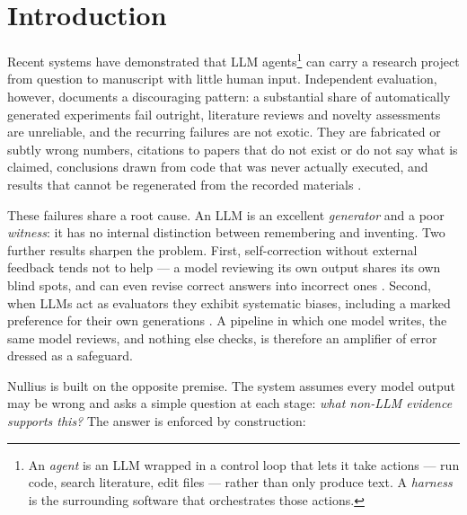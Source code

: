 \documentclass[11pt]{article}
\begin{document}
\vspace{1mm}

\section{Introduction}

Recent systems have demonstrated that LLM agents\footnote{An \emph{agent} is an LLM wrapped in a control loop that lets it take actions --- run code, search literature, edit files --- rather than only produce text. A \emph{harness} is the surrounding software that orchestrates those actions.} can carry a research project from question to manuscript with little human input. Independent evaluation, however, documents a discouraging pattern: a substantial share of automatically generated experiments fail outright, literature reviews and novelty assessments are unreliable, and the recurring failures are not exotic. They are fabricated or subtly wrong numbers, citations to papers that do not exist or do not say what is claimed, conclusions drawn from code that was never actually executed, and results that cannot be regenerated from the recorded materials \cite{beel2025}.

These failures share a root cause. An LLM is an excellent \emph{generator} and a poor \emph{witness}: it has no internal distinction between remembering and inventing. Two further results sharpen the problem. First, self-correction without external feedback tends not to help --- a model reviewing its own output shares its own blind spots, and can even revise correct answers into incorrect ones \cite{huang2024}. Second, when LLMs act as evaluators they exhibit systematic biases, including a marked preference for their own generations \cite{judge-bias, self-pref}. A pipeline in which one model writes, the same model reviews, and nothing else checks, is therefore an amplifier of error dressed as a safeguard.

Nullius is built on the opposite premise. The system assumes every model output may be wrong and asks a simple question at each stage: \emph{what non-LLM evidence supports this?} The answer is enforced by construction:
\end{document}
